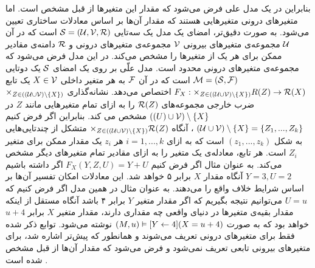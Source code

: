 بنابراین در یک مدل علی فرض می‌شود که مقدار این متغیر‌ها از قبل مشخص است.
اما متغیر‌های درونی متغیرهایی هستند که مقدار آن‌ها بر اساس معادلات ساختاری تعیین می‌شود.
به صورت دقیق‌تر، امضای
یک مدل یک سه‌تایی
$\mathcal{S} = (\mathcal{U},\mathcal{V},\mathcal{R})$
است که در آن
$\mathcal{U}$
مجموعه‌ی متغیر‌های بیرونی
$\mathcal{V}$
مجموعه‌ی متغیر‌های درونی و
$\mathcal{R}$
دامنه‌ی مقادیر ممکن برای هر یک از متغیر‌ها را مشخص می‌کند.
در این مدل فرض می‌شود که مجموعه‌ی متغیر‌های درونی محدود است.
مدل علّی بر روی یک امضای
$\mathcal{S}$
یک دوتایی
$\mathcal{M} = (\mathcal{S},\mathcal{F})$
است که در آن
$\mathcal{F}$
به هر متغیر داخلی
$X \in \mathcal{V}$
یک تابع
$F_X: \times_{Z\in ((\mathcal{U}\cup \mathcal{V})\setminus \{X\})}R(Z)
\rightarrow \mathcal{R}(X)$
اختصاص می‌دهد.
نشانه‌گذاری
$\times_{Z\in ((\mathcal{U}\cup \mathcal{V})\setminus \{X\})}$
ضرب خارجی
مجموعه‌های
$\mathcal{R}(Z)$
را به ازای تمام متغیر‌هایی مانند 
$Z$
در 
$(\mathcal{(}U)\cup \mathcal{V}) \setminus \{X\}$
مشخص می کند.
بنابراین اگر فرض کنیم
$(\mathcal{U}\cup \mathcal{V})\setminus \{X\} = \{Z_1,...,Z_k\}$
، آنگاه 
$\times_{Z\in ((\mathcal{U}\cup \mathcal{V})\setminus \{X\})}\mathcal{R}(Z)$
متشکل از چندتایی‌هایی به شکل
$(z_1,...,z_k)$
است که به ازای 
$i = 1,...,k$
هر 
$z_i$
یک مقدار ممکن برای متغیر 
$Z_i$
است.
هر تابع، معادله‌ی یک متغیر را به ازای مقادیر تمام متغیر‌های دیگر مشخص می‌کند.
به عنوان مثال اگر فرض کنیم
$F_X(Y,Z,U) = Y + U$
اگر داشته باشیم
$Y=3, U=2$
آنگاه مقدار
$X$
برابر ۵ خواهد شد.
این معادلات امکان تفسیر آن‌ها بر اساس شرایط خلاف واقع را می‌دهند.
به عنوان مثال در همین مدل اگر فرض کنیم که
$U=u$
می‌توانیم نتیجه بگیریم که اگر مقدار متغیر
$Y$
برابر ۴ باشد آنگاه مستقل از اینکه مقدار بقیه‌ی متغیر‌ها در دنیای واقعی چه مقداری دارند، مقدار متغیر
$X$
برابر
$u+4$
خواهد بود که به صورت
$(M,u) \vDash [Y \leftarrow 4](X = u + 4)$
نوشته می‌شود.
توابع ذکر شده فقط برای متغیر‌های درونی تعریف می‌شوند و همانطور که پیش‌تر اشاره شد، برای متغیرهای بیرونی تابعی تعریف نمی‌شود و فرض می‌شود که مقدار آن‌ها از قبل مشخص شده است
\cite{Halpern_2016}.

